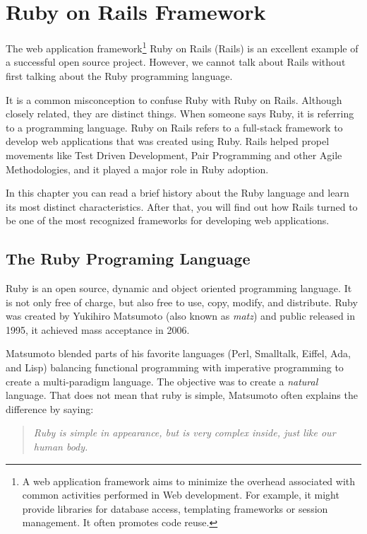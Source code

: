 \thispagestyle{empty}
\chapter{Ruby on Rails Framework}\label{chap:ruby_on_rails}

The \textsf{web application framework}\footnote{
  A web application framework aims to minimize the overhead associated with common activities performed in Web development. 
  For example, it might provide libraries for database access, templating frameworks or session management. 
  It often promotes code reuse.
} Ruby on Rails (Rails) is an excellent example of a successful open source project.
However, we cannot talk about Rails without first talking about the Ruby programming language.

It is a common misconception to confuse Ruby with Ruby on Rails. 
Although closely related, they are distinct things.
When someone says Ruby, it is referring to a programming language.
Ruby on Rails refers to a full-stack framework to develop web applications that was created using Ruby.
Rails helped propel movements like 
Test Driven Development, Pair Programming and other Agile Methodologies, 
and it played a major role in Ruby adoption. 

In this chapter you can read a brief history about the Ruby language
and learn its most distinct characteristics.
After that, you will find out how Rails turned to be one of the 
most recognized frameworks for developing web applications. 



\section{The Ruby Programing Language} 
Ruby is an open source, dynamic and object oriented programming language.
It is not only free of charge, but also free to use, copy, modify, and distribute.
Ruby was created by Yukihiro Matsumoto (also known as \emph{matz}) and public released in 1995, 
it achieved mass acceptance in 2006.

Matsumoto blended parts of his favorite languages (Perl, Smalltalk, Eiffel, Ada, and Lisp) 
balancing functional programming with imperative programming 
to create a multi-paradigm language. 
The objective was to create a \emph{natural} language. 
That does not mean that ruby is simple, Matsumoto often explains the difference by saying:

\begin{quote}\emph{
  Ruby is simple in appearance, but is very complex inside, just like our human body.
}\end{quote}

